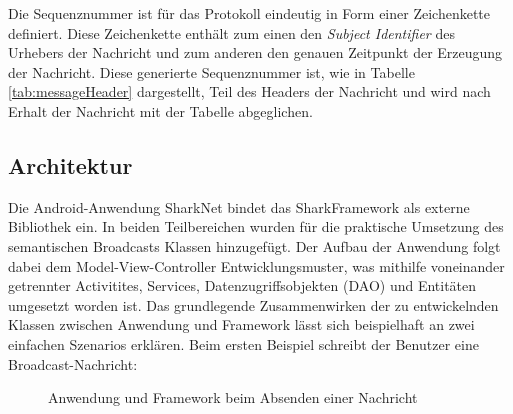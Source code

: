 Die Sequenznummer ist für das Protokoll eindeutig in Form einer Zeichenkette definiert. Diese Zeichenkette enthält zum einen den \textit{Subject Identifier} des Urhebers der Nachricht und zum anderen den genauen Zeitpunkt der Erzeugung der Nachricht. Diese generierte Sequenznummer ist, wie in Tabelle \ref{tab:messageHeader} dargestellt, Teil des Headers der Nachricht und wird nach Erhalt der Nachricht mit der Tabelle abgeglichen.\\
\subsection{Architektur}
Die Android-Anwendung SharkNet bindet das SharkFramework als externe Bibliothek ein. In beiden Teilbereichen wurden für die praktische Umsetzung des semantischen Broadcasts Klassen hinzugefügt. Der Aufbau der Anwendung folgt dabei dem Model-View-Controller Entwicklungsmuster, was mithilfe voneinander getrennter Activitites, Services, Datenzugriffsobjekten (DAO) und Entitäten umgesetzt worden ist. Das grundlegende Zusammenwirken der zu entwickelnden Klassen zwischen Anwendung und Framework lässt sich beispielhaft an zwei einfachen Szenarios erklären. Beim ersten Beispiel schreibt der Benutzer eine Broadcast-Nachricht:
\begin{figure}[H]
	\centering
	\caption{Anwendung und Framework beim Absenden einer Nachricht}
	\label{fig:sendenNachrichtStruktur}
\end{figure}
\vspace*{0.8em}
